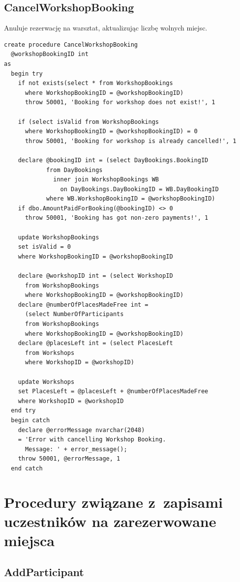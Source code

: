 \documentclass[12pt, a4paper]{mwrep}
\begin{document}
\subsection{CancelWorkshopBooking}

\noindent Anuluje rezerwację na warsztat, aktualizując liczbę wolnych miejsc.

\begin{lstlisting}
create procedure CancelWorkshopBooking
  @workshopBookingID int
as
  begin try
    if not exists(select * from WorkshopBookings 
      where WorkshopBookingID = @workshopBookingID)
      throw 50001, 'Booking for workshop does not exist!', 1

    if (select isValid from WorkshopBookings
      where WorkshopBookingID = @workshopBookingID) = 0
      throw 50001, 'Booking for workshop is already cancelled!', 1

    declare @bookingID int = (select DayBookings.BookingID
            from DayBookings
              inner join WorkshopBookings WB
                on DayBookings.DayBookingID = WB.DayBookingID
            where WB.WorkshopBookingID = @workshopBookingID)
    if dbo.AmountPaidForBooking(@bookingID) <> 0
      throw 50001, 'Booking has got non-zero payments!', 1

    update WorkshopBookings
    set isValid = 0
    where WorkshopBookingID = @workshopBookingID

    declare @workshopID int = (select WorkshopID 
      from WorkshopBookings 
      where WorkshopBookingID = @workshopBookingID)
    declare @numberOfPlacesMadeFree int = 
      (select NumberOfParticipants 
      from WorkshopBookings 
      where WorkshopBookingID = @workshopBookingID)
    declare @placesLeft int = (select PlacesLeft 
      from Workshops 
      where WorkshopID = @workshopID)

    update Workshops
    set PlacesLeft = @placesLeft + @numberOfPlacesMadeFree
    where WorkshopID = @workshopID
  end try
  begin catch
    declare @errorMessage nvarchar(2048)
    = 'Error with cancelling Workshop Booking. 
      Message: ' + error_message();
    throw 50001, @errorMessage, 1
  end catch
\end{lstlisting}

\newpage
\section{Procedury związane z~zapisami uczestników na zarezerwowane miejsca}

\subsection{AddParticipant}
\end{document}
